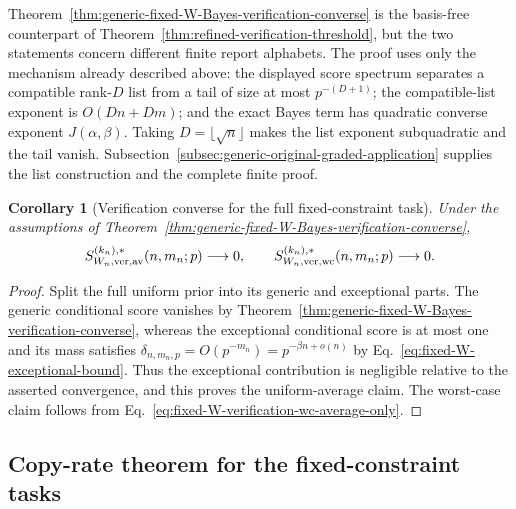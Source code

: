 \documentclass[11pt]{article}
\newcommand{\1}{\mathbf 1}
\theoremstyle{plain}
\newtheorem{corollary}[theorem]{Corollary}
\theoremstyle{definition}
\theoremstyle{remark}
\begin{document}
Theorem~\ref{thm:generic-fixed-W-Bayes-verification-converse} is the
basis-free counterpart of Theorem~\ref{thm:refined-verification-threshold},
but the two statements concern different finite report alphabets.  The proof
uses only the mechanism already described above: the displayed score spectrum
separates a compatible rank-$D$ list from a tail of size at most $p^{-(D+1)}$;
the compatible-list exponent is $O(Dn+D m)$; and the exact Bayes term has
quadratic converse exponent $J(\alpha,\beta)$.  Taking
$D=\lfloor\sqrt n\rfloor$ makes the list exponent subquadratic and the tail
vanish.  Subsection~\ref{subsec:generic-original-graded-application} supplies
the list construction and the complete finite proof.

\begin{corollary}[Verification converse for the full fixed-constraint task]
\label{cor:full-fixed-W-verification-converse}
Under the assumptions of
Theorem~\ref{thm:generic-fixed-W-Bayes-verification-converse},
\begin{equation}
 S_{W_n,\rm ver,av}^{(k_n),*}(n,m_n;p)\longrightarrow0,
 \qquad
 S_{W_n,\rm ver,wc}^{(k_n),*}(n,m_n;p)\longrightarrow0.
 \label{eq:section4-full-original-verification-converse}
\end{equation}
\end{corollary}
\begin{proof}
Split the full uniform prior into its generic and exceptional parts.  The
generic conditional score vanishes by
Theorem~\ref{thm:generic-fixed-W-Bayes-verification-converse}, whereas the
exceptional conditional score is at most one and its mass satisfies
$\delta_{n,m_n,p}=O(p^{-m_n})=p^{-\beta n+o(n)}$ by
Eq.~\eqref{eq:fixed-W-exceptional-bound}.  Thus the exceptional contribution
is negligible relative to the asserted convergence, and this proves the
uniform-average claim.  The worst-case claim follows from
Eq.~\eqref{eq:fixed-W-verification-wc-average-only}.
\end{proof}

\subsection{Copy-rate theorem for the fixed-constraint tasks}
\label{subsec:fixed-W-rates}
\end{document}
